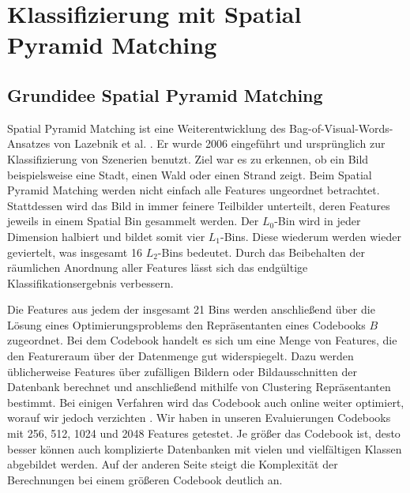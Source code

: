 \section{Klassifizierung mit Spatial Pyramid Matching}

\subsection{Grundidee Spatial Pyramid Matching}

Spatial Pyramid Matching ist eine Weiterentwicklung des Bag-of-Visual-Words-Ansatzes von Lazebnik et al. \cite{lsp06}. Er wurde 2006 eingeführt und ursprünglich zur Klassifizierung von Szenerien benutzt. Ziel war es zu erkennen, ob ein Bild beispielsweise eine Stadt, einen Wald oder einen Strand zeigt. Beim Spatial Pyramid Matching werden nicht einfach alle Features ungeordnet betrachtet. Stattdessen wird das Bild in immer feinere Teilbilder unterteilt, deren Features jeweils in einem Spatial Bin gesammelt werden. Der $L_0$-Bin wird in jeder Dimension halbiert und bildet somit vier $L_1$-Bins. Diese wiederum werden wieder geviertelt, was insgesamt 16 $L_2$-Bins bedeutet. Durch das Beibehalten der räumlichen Anordnung aller Features lässt sich das endgültige Klassifikationsergebnis verbessern.

Die Features aus jedem der insgesamt 21 Bins werden anschließend über die Lösung eines Optimierungsproblems den Repräsentanten eines Codebooks $B$ zugeordnet. Bei dem Codebook handelt es sich um eine Menge von Features, die den Featureraum über der Datenmenge gut widerspiegelt. Dazu werden üblicherweise Features über zufälligen Bildern oder Bildausschnitten der Datenbank berechnet und anschließend mithilfe von Clustering Repräsentanten bestimmt. Bei einigen Verfahren wird das Codebook auch online weiter optimiert, worauf wir jedoch verzichten \cite{wyylhg10}. Wir haben in unseren Evaluierungen Codebooks mit 256, 512, 1024 und 2048 Features getestet. Je größer das Codebook ist, desto besser können auch komplizierte Datenbanken mit vielen und vielfältigen Klassen abgebildet werden. Auf der anderen Seite steigt die Komplexität der Berechnungen bei einem größeren Codebook deutlich an.

